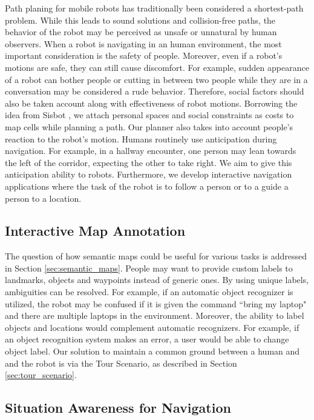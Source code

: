 Path planing for mobile robots has traditionally been considered a shortest-path problem. While this leads to sound solutions and collision-free paths, the behavior of the robot may be perceived as unsafe or unnatural by human observers. When a robot is navigating in an human environment, the most important consideration is the safety of people. Moreover, even if a robot's motions are safe, they can still cause discomfort. For example, sudden appearance of a robot can bother people or cutting in between two people while they are in a conversation may be considered a rude behavior. Therefore, social factors should also be taken account along with effectiveness of robot motions. Borrowing the idea from Sisbot \cite{sisbot2007human}, we attach personal spaces and social constraints as costs to map cells while planning a path. Our planner also takes into account people's reaction to the robot's motion. Humans routinely use anticipation during navigation. For example, in a hallway encounter, one person may lean towards the left of the corridor, expecting the other to take right. We aim to give this anticipation ability to robots. Furthermore, we develop interactive navigation applications where the task of the robot is to follow a person or to a guide a person to a location.

\subsection{Interactive Map Annotation}

The question of how semantic maps could be useful for various tasks is addressed in Section \ref{sec:semantic_maps}. People may want to provide custom labels to landmarks, objects and waypoints instead of generic ones. By using unique labels, ambiguities can be resolved. For example, if an automatic object recognizer is utilized, the robot may be confused if it is given the command ``bring my laptop" and there are multiple laptops in the environment. Moreover, the ability to label objects and locations would complement automatic recognizers. For example, if an object recognition system makes an error, a user would be able to change object label. Our solution to maintain a common ground between a human and and the robot is via the Tour Scenario, as described in Section \ref{sec:tour_scenario}.

\subsection{Situation Awareness for Navigation}

